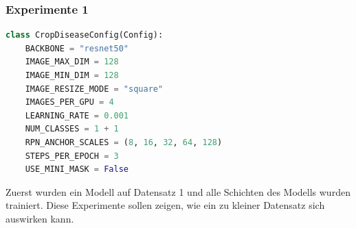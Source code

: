 \subsubsection{Experimente 1}\label{sub:sub:sec:experiment-1}

\begin{lstlisting}[language=python,caption={Konfiguration für Experimente 1},captionpos=b]
class CropDiseaseConfig(Config):
    BACKBONE = "resnet50"
    IMAGE_MAX_DIM = 128
    IMAGE_MIN_DIM = 128
    IMAGE_RESIZE_MODE = "square"
    IMAGES_PER_GPU = 4
    LEARNING_RATE = 0.001
    NUM_CLASSES = 1 + 1
    RPN_ANCHOR_SCALES = (8, 16, 32, 64, 128)
    STEPS_PER_EPOCH = 3
    USE_MINI_MASK = False
\end{lstlisting}
\noindent
Zuerst wurden ein Modell auf Datensatz 1 und alle Schichten des Modells wurden trainiert. Diese Experimente sollen zeigen, wie ein zu kleiner Datensatz sich auswirken kann.

